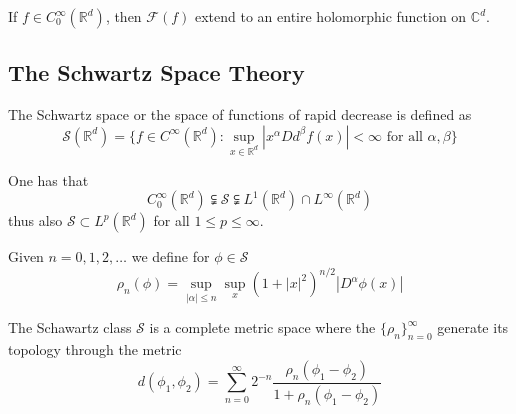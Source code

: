 \documentclass{article}
\newcommand{\RR}{\mathbb{R}}
\newcommand{\CC}{\mathbb{C}}
\newcommand{\FT}{\mathcal{F}}
\newcommand{\Sch}{\mathcal{S}}
\begin{document}
\begin{theorem}
  If $f \in C_0^\infty(\RR^d)$, then $\FT(f)$ extend to an entire holomorphic function on $\CC^d$.
\end{theorem}

\subsection{The Schwartz Space Theory}
\begin{principle}
  The Schwartz space or the space of functions of rapid decrease is defined as
  \begin{equation*}
    \Sch(\RR^d) = \{f \in C^\infty(\RR^d): \sup_{x \in \RR^d} |x^\alpha Dd^\beta f(x)| < \infty \text{ for all $\alpha, \beta$}\}
  \end{equation*}
\end{principle}

\begin{proposition}
  One has that
  \begin{equation*}
    C_0^\infty(\RR^d) \subsetneqq \Sch \subsetneqq L^1(\RR^d) \cap L^\infty(\RR^d)
  \end{equation*}
  thus also $\Sch \subset L^p(\RR^d)$ for all $1 \leq p \leq \infty$.
\end{proposition}


\begin{principle}
  Given $n=0,1,2,\dots$ we define for $\phi \in \Sch$
  \begin{equation*}
    \rho_n(\phi) = \sup_{|\alpha| \leq n}\sup_x (1 + |x|^2)^{n/2} |D^\alpha \phi(x)|
  \end{equation*}
\end{principle}

\begin{proposition}
  The Schawartz class $\Sch$ is a complete metric space where the $\{\rho_n\}_{n=0}^\infty$ generate its topology through the metric
  \begin{equation*}
    d(\phi_1,\phi_2) = \sum_{n=0}^\infty 2^{-n} \frac{\rho_n(\phi_1 - \phi_2)}{1 + \rho_n(\phi_1 - \phi_2)}
  \end{equation*}
\end{proposition}
\end{document}
